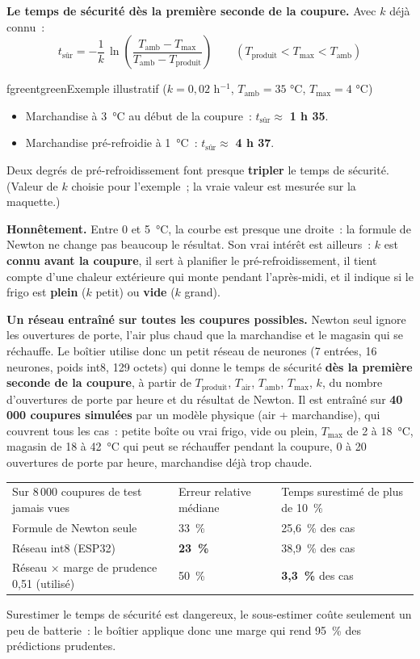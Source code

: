 \documentclass[10pt,a4paper]{article}
\begin{document}
\textbf{Le temps de sécurité dès la première seconde de la coupure.} Avec $k$ déjà connu~:
\[ t_{\text{sûr}} = -\frac{1}{k}\,\ln\!\left(\frac{T_{\text{amb}} - T_{\max}}{T_{\text{amb}} - T_{\text{produit}}}\right) \qquad (T_{\text{produit}} < T_{\max} < T_{\text{amb}}) \]

\begin{tbox}{fgreen}{tgreen}{Exemple illustratif ($k = 0{,}02$ h$^{-1}$, $T_{\text{amb}} = 35$ °C, $T_{\max} = 4$ °C)}
\begin{itemize}[nosep]
  \item Marchandise à 3~°C au début de la coupure~: $t_{\text{sûr}} \approx$ \textbf{1 h 35}.
  \item Marchandise pré-refroidie à 1~°C~: $t_{\text{sûr}} \approx$ \textbf{4 h 37}.
\end{itemize}
Deux degrés de pré-refroidissement font presque \textbf{tripler} le temps de sécurité. (Valeur de $k$ choisie pour l'exemple~; la vraie valeur est mesurée sur la maquette.)
\end{tbox}

\textbf{Honnêtement.} Entre 0 et 5~°C, la courbe est presque une droite~: la formule de Newton ne change pas beaucoup le résultat. Son vrai intérêt est ailleurs~: $k$ est \textbf{connu avant la coupure}, il sert à planifier le pré-refroidissement, il tient compte d'une chaleur extérieure qui monte pendant l'après-midi, et il indique si le frigo est \textbf{plein} ($k$ petit) ou \textbf{vide} ($k$ grand).

\textbf{Un réseau entraîné sur toutes les coupures possibles.} Newton seul ignore les ouvertures de porte, l'air plus chaud que la marchandise et le magasin qui se réchauffe. Le boîtier utilise donc un petit réseau de neurones (7 entrées, 16 neurones, poids int8, 129 octets) qui donne le temps de sécurité \textbf{dès la première seconde de la coupure}, à partir de $T_{\text{produit}}$, $T_{\text{air}}$, $T_{\text{amb}}$, $T_{\max}$, $k$, du nombre d'ouvertures de porte par heure et du résultat de Newton. Il est entraîné sur \textbf{40\,000 coupures simulées} par un modèle physique (air + marchandise), qui couvrent tous les cas~: petite boîte ou vrai frigo, vide ou plein, $T_{\max}$ de 2 à 18~°C, magasin de 18 à 42~°C qui peut se réchauffer pendant la coupure, 0 à 20 ouvertures de porte par heure, marchandise déjà trop chaude.

\begin{tabularx}{\linewidth}{Q{5.2cm}P{3.2cm}L}
 Sur 8\,000 coupures de test jamais vues & \mdseries Erreur relative médiane & \mdseries Temps surestimé de plus de 10~\% \\
Formule de Newton seule & 33~\% & 25,6~\% des cas \\
Réseau int8 (ESP32) & \textbf{23~\%} & 38,9~\% des cas \\
Réseau $\times$ marge de prudence 0,51 (utilisé) & 50~\% & \textbf{3,3~\%} des cas \\
\end{tabularx}
Surestimer le temps de sécurité est dangereux, le sous-estimer coûte seulement un peu de batterie~: le boîtier applique donc une marge qui rend 95~\% des prédictions prudentes.
\end{document}
